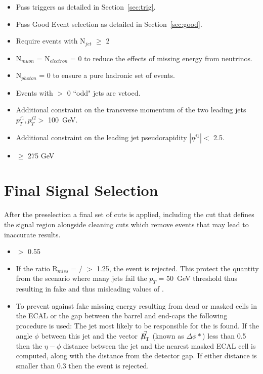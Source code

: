 \begin{itemize}
\item Pass triggers as detailed in Section~\ref{sec:trig}.
\item Pass Good Event selection as detailed in Section~\ref{sec:good}.
\item{Require events with N$_{jet}$ $\geq$ 2}
\item N$_{muon}$ = N$_{electron}$ = 0 to reduce the effects of missing energy from neutrinos.
\item N$_{photon}$ = 0 to ensure a pure hadronic set of events.
\item Events with $>$ 0 ``odd" jets are vetoed.
\item Additional constraint on the transverse momentum of the two leading jets $p^{j1}_{T},p^{j2}_{T} >$ 100~GeV.
\item Additional constraint on the leading jet pseudorapidity $|\eta^{j1}| <$ 2.5.
\item \HT $\geq$ 275 GeV
\end{itemize}



\section{Final Signal Selection}

After the preselection a final set of cuts is applied, including the \alt cut that defines the signal region alongside cleaning cuts which remove events that may lead to inaccurate results.

\begin{itemize}
\item \alt $>$ 0.55
\item{If the ratio R$_{miss}$ = \mht / \met $>$ 1.25, the event is rejected. This protect the quantity \alt from the scenario where many jets fail the $p_{T}$ = 50~GeV threshold thus resulting in fake \mht and thus misleading values of \alt. }
\item{To prevent against fake missing energy resulting from dead or masked cells in the ECAL or the gap between the barrel and end-caps the following procedure is used: The jet most likely to be responsible for the \MHT is found. If the angle $\phi$ between this jet and the vector $\vec{\MHT}$ (known as $\Delta \phi*$) less than 0.5 then the $\eta-\phi$ distance between the jet and the nearest masked ECAL cell is computed, along with the distance from the detector gap. If either distance is smaller than 0.3 then the event is rejected. }

\end{itemize}




